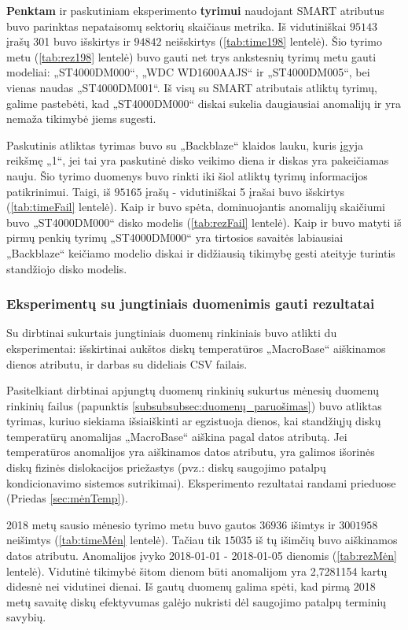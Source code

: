 \documentclass{VUMIFPSkursinis}
\begin{document}
\textbf{Penktam} ir paskutiniam eksperimento \textbf{tyrimui} naudojant SMART atributus buvo parinktas nepataisomų sektorių skaičiaus metrika. Iš vidutiniškai $95 143$ įrašų 301 buvo išskirtys ir $94 842$ neišskirtys (\ref{tab:time198} lentelė). Šio tyrimo metu (\ref{tab:rez198} lentelė) buvo gauti net trys ankstesnių tyrimų metu gauti modeliai: „ST4000DM000“, „WDC WD1600AAJS“ ir „ST4000DM005“, bei vienas naudas „ST4000DM001“. Iš visų su SMART atributais atliktų tyrimų, galime pastebėti, kad „ST4000DM000“ diskai sukelia daugiausiai anomalijų ir yra nemaža tikimybė jiems sugesti.

Paskutinis atliktas tyrimas buvo su „Backblaze“ klaidos lauku, kuris įgyja reikšmę „1“, jei tai yra paskutinė disko veikimo diena ir diskas yra pakeičiamas nauju. Šio tyrimo duomenys buvo rinkti iki šiol atliktų tyrimų informacijos patikrinimui. Taigi, iš $95 165$ įrašų - vidutiniškai 5 įrašai buvo išskirtys (\ref{tab:timeFail} lentelė). Kaip ir buvo spėta, dominuojantis anomalijų skaičiumi buvo „ST4000DM000“ disko modelis (\ref{tab:rezFail} lentelė). Kaip ir buvo matyti iš pirmų penkių tyrimų „ST4000DM000“ yra tirtosios savaitės labiausiai „Backblaze“ keičiamo modelio diskai ir didžiausią tikimybę gesti ateityje turintis standžiojo disko modelis.

\subsubsection{Eksperimentų su jungtiniais duomenimis gauti rezultatai}
Su dirbtinai sukurtais jungtiniais duomenų rinkiniais buvo atlikti du eksperimentai: išskirtinai aukštos diskų temperatūros „MacroBase“ aiškinamos dienos atributu, ir darbas su dideliais CSV failais.

 \label{subsubsubsec:mėn}
Pasitelkiant dirbtinai apjungtų duomenų rinkinių sukurtus mėnesių duomenų rinkinių failus (papunktis \ref{subsubsubsec:duomenų_paruošimas}) buvo atliktas tyrimas, kuriuo siekiama išsiaiškinti ar egzistuoja dienos, kai standžiųjų diskų temperatūrų anomalijas „MacroBase“ aiškina pagal datos atributą. Jei temperatūros anomalijos yra aiškinamos datos atributu, yra galimos išorinės diskų fizinės dislokacijos priežastys (pvz.: diskų saugojimo patalpų kondicionavimo sistemos sutrikimai). Eksperimento rezultatai randami prieduose (Priedas \ref{sec:mėnTemp}).\par

2018 metų sausio mėnesio tyrimo metu buvo gautos $36 936$ išimtys ir $3 001 958$ neišimtys (\ref{tab:timeMėn} lentelė). Tačiau tik $15 035$ iš tų išimčių buvo aiškinamos datos atributu. Anomalijos įvyko 2018-01-01 - 2018-01-05 dienomis (\ref{tab:rezMėn} lentelė). Vidutinė tikimybė šitom dienom būti anomalijom yra 2,7281154 kartų didesnė nei vidutinei dienai. Iš gautų duomenų galima spėti, kad pirmą 2018 metų savaitę diskų efektyvumas galėjo nukristi dėl saugojimo patalpų terminių savybių.\par
\end{document}
